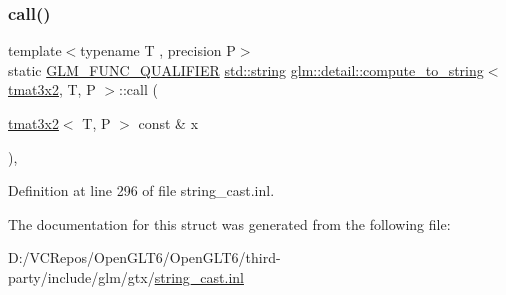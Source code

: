\subsubsection{\texorpdfstring{call()}{call()}}
{\footnotesize\ttfamily template$<$typename T , precision P$>$ \\
static \mbox{\hyperlink{setup_8hpp_a33fdea6f91c5f834105f7415e2a64407}{G\+L\+M\+\_\+\+F\+U\+N\+C\+\_\+\+Q\+U\+A\+L\+I\+F\+I\+ER}} \mbox{\hyperlink{glad_8h_ac83513893df92266f79a515488701770}{std\+::string}} \mbox{\hyperlink{structglm_1_1detail_1_1compute__to__string}{glm\+::detail\+::compute\+\_\+to\+\_\+string}}$<$ \mbox{\hyperlink{structglm_1_1tmat3x2}{tmat3x2}}, T, P $>$\+::call (\begin{DoxyParamCaption}\item[{\mbox{\hyperlink{structglm_1_1tmat3x2}{tmat3x2}}$<$ T, P $>$ const \&}]{x }\end{DoxyParamCaption})\hspace{0.3cm}{\ttfamily [inline]}, {\ttfamily [static]}}



Definition at line 296 of file string\+\_\+cast.\+inl.



The documentation for this struct was generated from the following file\+:\begin{DoxyCompactItemize}
\item 
D\+:/\+V\+C\+Repos/\+Open\+G\+L\+T6/\+Open\+G\+L\+T6/third-\/party/include/glm/gtx/\mbox{\hyperlink{string__cast_8inl}{string\+\_\+cast.\+inl}}\end{DoxyCompactItemize}
